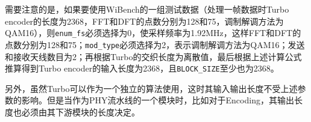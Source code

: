 \documentclass[titlepage]{article}
\numberwithin{figure}{section}
\numberwithin{equation}{section}
\begin{document}
需要注意的是，如果要使用WiBench的一组测试数据（处理一帧数据时Turbo encoder的长度为2368，FFT和DFT的点数分别为128和75，调制解调方法为QAM16），则\verb|enum_fs|必须选择为0，使采样频率为1.92MHz，这样FFT和DFT的点数分别为128和75；\verb|mod_type|必须选择为2，表示调制解调方法为QAM16；发送和接收天线数目为2；再根据Turbo的交织长度为离散值，最后根据上述计算公式推算得到Turbo encoder的输入长度为2368，且\verb|BLOCK_SIZE|至少也为2368。

另外，虽然Turbo可以作为一个独立的算法使用，这时其输入输出长度不受上述参数的影响。但是当作为PHY流水线的一个模块时，比如对于Encoding，其输出长度也必须由其下游模块的长度决定。




\end{document}
